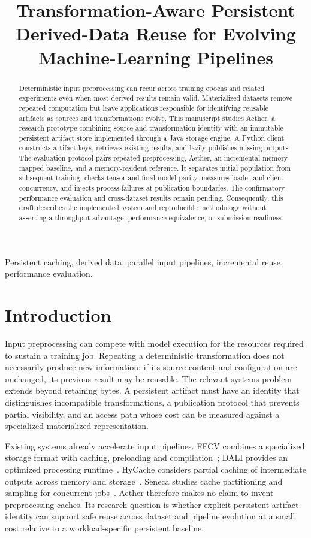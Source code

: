 \documentclass[journal]{IEEEtran}
\title{Transformation-Aware Persistent Derived-Data Reuse for Evolving Machine-Learning Pipelines}
\author{\pending{Author names, affiliations, and ORCID}}
\begin{document}
\maketitle
\begin{abstract}
Deterministic input preprocessing can recur across training epochs and related experiments even when most derived results remain valid. Materialized datasets remove repeated computation but leave applications responsible for identifying reusable artifacts as sources and transformations evolve. This manuscript studies Aether, a research prototype combining source and transformation identity with an immutable persistent artifact store implemented through a Java storage engine. A Python client constructs artifact keys, retrieves existing results, and lazily publishes missing outputs. The evaluation protocol pairs repeated preprocessing, Aether, an incremental memory-mapped baseline, and a memory-resident reference. It separates initial population from subsequent training, checks tensor and final-model parity, measures loader and client concurrency, and injects process failures at publication boundaries. The confirmatory performance evaluation and cross-dataset results remain pending. Consequently, this draft describes the implemented system and reproducible methodology without asserting a throughput advantage, performance equivalence, or submission readiness.
\end{abstract}
\begin{IEEEkeywords}
Persistent caching, derived data, parallel input pipelines, incremental reuse, performance evaluation.
\end{IEEEkeywords}

\section{Introduction}
Input preprocessing can compete with model execution for the resources required to sustain a training job. Repeating a deterministic transformation does not necessarily produce new information: if its source content and configuration are unchanged, its previous result may be reusable. The relevant systems problem extends beyond retaining bytes. A persistent artifact must have an identity that distinguishes incompatible transformations, a publication protocol that prevents partial visibility, and an access path whose cost can be measured against a specialized materialized representation.

Existing systems already accelerate input pipelines. FFCV combines a specialized storage format with caching, preloading and compilation~\cite{ffcv}; DALI provides an optimized processing runtime~\cite{dali}. HyCache considers partial caching of intermediate outputs across memory and storage~\cite{hycache}. Seneca studies cache partitioning and sampling for concurrent jobs~\cite{seneca}. Aether therefore makes no claim to invent preprocessing caches. Its research question is whether explicit persistent artifact identity can support safe reuse across dataset and pipeline evolution at a small cost relative to a workload-specific persistent baseline.
\end{document}
